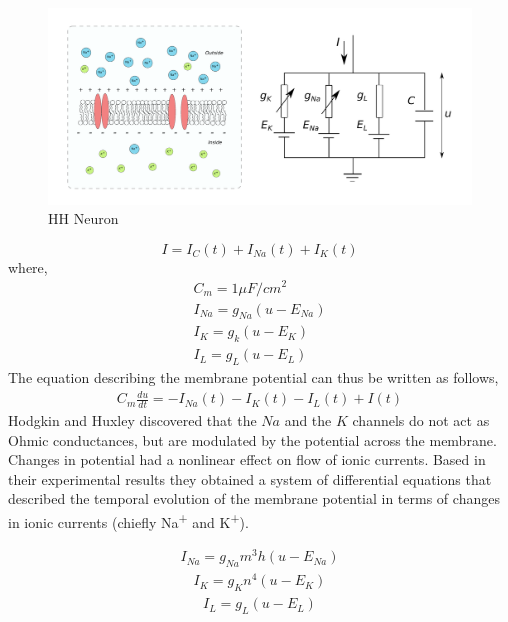\documentclass[10pt,letterpaper]{article}
\begin{document}
\begin{figure}[H]
\begin{center}
\includegraphics[scale=0.4]{Figures/fig7.pdf} 
\caption{HH Neuron}
\label{fig:HH}
\end{center}
\end{figure}

\begin{equation}
I = I_{C}(t) + I_{Na}(t) + I_{K}(t)
\end{equation}
where, 
\begin{eqnarray}
C_m = 1 \mu F/cm^2 \\
I_{Na} = g_{Na}(u-E_{Na})\\
I_{K} = g_{k}(u-E_K)\\
I_{L} = g_{L}(u-E_L)
\end{eqnarray}
The equation describing the membrane potential can thus be written as follows,
\begin{eqnarray}
\label{eq:HH}
C_m\frac{du}{dt}=−I_{Na}(t)−I_{K}(t)−I_{L}(t)+I(t)
\end{eqnarray}
Hodgkin and Huxley discovered that the $Na$ and the $K$ channels do not act as Ohmic conductances, but are modulated by the potential across the membrane. 
Changes in potential had a nonlinear effect on flow of ionic currents. Based in their experimental results they obtained a system of differential equations that described the temporal evolution of the membrane potential in terms of changes in ionic currents (chiefly Na\textsuperscript{+} and K\textsuperscript{+}). 

\begin{eqnarray}\label{d3_2}I_{Na} = g_{Na}m^3h(u−E_{Na})\end{eqnarray}
\begin{eqnarray}\label{d3_3}I_K = g_Kn^4(u−E_K)\end{eqnarray}
\begin{eqnarray}\label{d3_4}I_L = g_L(u−E_L)\end{eqnarray}
\end{document}
